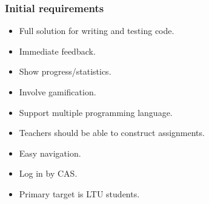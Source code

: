 \subsubsection{Initial requirements} 
 \begin{itemize}
\item Full solution for writing and testing code.
\item Immediate feedback.
\item Show progress/statistics.
\item Involve gamification.
\item Support multiple programming language.
\item Teachers should be able to construct assignments.
\item Easy navigation.
\item Log in by CAS. 
\item Primary target is LTU students.
 \end{itemize}
